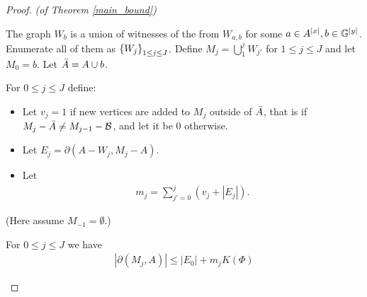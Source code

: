 \documentclass{amsart}
\begin{document}
\begin{proof} \textit{(of Theorem \ref{main_bound})}

  The graph $W_b$ is a union of witnesses of the from $W_{a,b}$ for some $a \in A^{|x|}, b \in \mathbb G^{|y|}$.
  Enumerate all of them as $\left\{W_j\right\}_{1 \leq j \leq J}$.
  Define $M_j = \bigcup_1^j W_{j'}$ for $1 \leq j \leq J$ and let $M_0 = b$.
  Let $\bar A = A \cup b$.
  \begin{Definition}
    For $0 \leq j \leq J$ define:
    \begin{itemize}
    \item Let $v_j = 1$ if new vertices are added to $M_j$ outside of $\bar A$, that is if
      $M_j - \bar A \neq M_{j-1} - \mathcal B$,
      and let it be $0$ otherwise.
    \item Let %
      $E_j = \partial(A - W_j, M_j - A)$.
    \item Let
      \begin{align*}
        m_j = \sum_{j' = 0}^j (v_j + |E_j|).
      \end{align*}
    \end{itemize}
    (Here assume $M_{-1} = \emptyset$.)
  \end{Definition}

  \begin{Lemma} \label{ubd_lemma}
    For $0 \leq j \leq J$ we have
    \begin{align*}
      |\partial(M_j, A)| \leq |E_0| + m_j K(\Phi) 
    \end{align*}
  \end{Lemma}


\end{proof}
\end{document}
